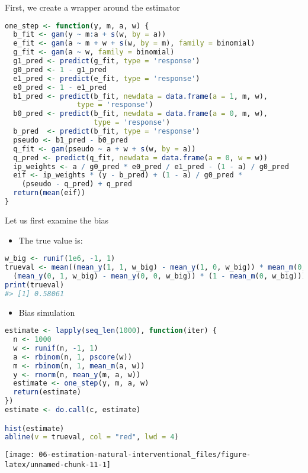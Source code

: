 \documentclass[
  12pt,
]{book}
\providecommand{\tightlist}{%
  \setlength{\itemsep}{0pt}\setlength{\parskip}{0pt}}
\theoremstyle{definition}
\theoremstyle{definition}
\theoremstyle{definition}
\newcommand{\1}{\mathbbm{1}}
\begin{document}
First, we create a wrapper around the estimator

\begin{lstlisting}[language=R]
one_step <- function(y, m, a, w) {
  b_fit <- gam(y ~ m:a + s(w, by = a))
  e_fit <- gam(a ~ m + w + s(w, by = m), family = binomial)
  g_fit <- gam(a ~ w, family = binomial)
  g1_pred <- predict(g_fit, type = 'response')
  g0_pred <- 1 - g1_pred
  e1_pred <- predict(e_fit, type = 'response')
  e0_pred <- 1 - e1_pred
  b1_pred <- predict(b_fit, newdata = data.frame(a = 1, m, w),
                 type = 'response')
  b0_pred <- predict(b_fit, newdata = data.frame(a = 0, m, w),
                     type = 'response')
  b_pred  <- predict(b_fit, type = 'response')
  pseudo <- b1_pred - b0_pred
  q_fit <- gam(pseudo ~ a + w + s(w, by = a))
  q_pred <- predict(q_fit, newdata = data.frame(a = 0, w = w))
  ip_weights <- a / g0_pred * e0_pred / e1_pred - (1 - a) / g0_pred
  eif <- ip_weights * (y - b_pred) + (1 - a) / g0_pred *
    (pseudo - q_pred) + q_pred
  return(mean(eif))
}
\end{lstlisting}

Let us first examine the bias

\begin{itemize}
\tightlist
\item
  The true value is:
\end{itemize}

\begin{lstlisting}[language=R]
w_big <- runif(1e6, -1, 1)
trueval <- mean((mean_y(1, 1, w_big) - mean_y(1, 0, w_big)) * mean_m(0, w_big) +
  (mean_y(0, 1, w_big) - mean_y(0, 0, w_big)) * (1 - mean_m(0, w_big)))
print(trueval)
#> [1] 0.58061
\end{lstlisting}

\begin{itemize}
\tightlist
\item
  Bias simulation
\end{itemize}

\begin{lstlisting}[language=R]
estimate <- lapply(seq_len(1000), function(iter) {
  n <- 1000
  w <- runif(n, -1, 1)
  a <- rbinom(n, 1, pscore(w))
  m <- rbinom(n, 1, mean_m(a, w))
  y <- rnorm(n, mean_y(m, a, w))
  estimate <- one_step(y, m, a, w)
  return(estimate)
})
estimate <- do.call(c, estimate)

hist(estimate)
abline(v = trueval, col = "red", lwd = 4)
\end{lstlisting}

\begin{center}\texttt{[image: 06-estimation-natural-interventional\_files/figure-latex/unnamed-chunk-11-1]} \end{center}
\end{document}
